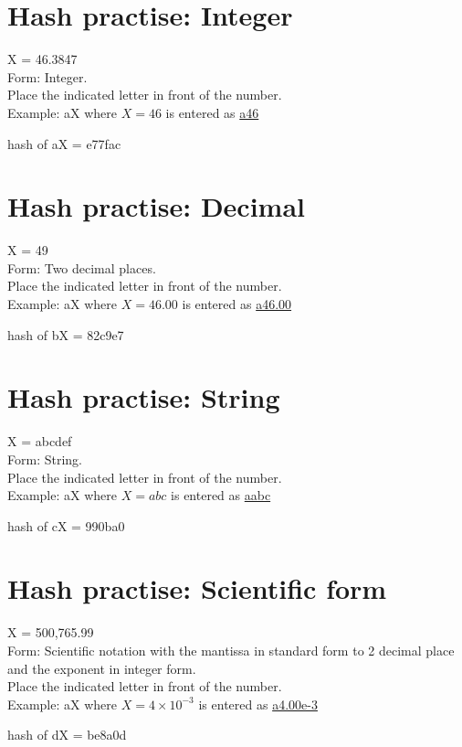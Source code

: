 \section{Hash practise: Integer}

X = 46.3847\\
Form: Integer.\\
Place the indicated letter in front of the number.\\
Example: aX where $X=46$ is entered as \href{http://www.wolframalpha.com/input/?i=md5+hash+of+\%22a46\%22}{a46}

hash of aX = e77fac

\section{Hash practise: Decimal}

X = 49\\
Form: Two decimal places.\\
Place the indicated letter in front of the number.\\
Example: aX where $X=46.00$ is entered as \href{http://www.wolframalpha.com/input/?i=md5+hash+of+\%22a46.00\%22}{a46.00}

hash of bX = 82c9e7

\section{Hash practise: String}

X = abcdef\\
Form: String.\\
Place the indicated letter in front of the number.\\
Example: aX where $X=abc$ is entered as \href{http://www.wolframalpha.com/input/?i=md5+hash+of+\%22aabc\%22}{aabc}

hash of cX = 990ba0

\section{Hash practise: Scientific form}

X = 500,765.99\\
Form: Scientific notation with the mantissa in standard form to 2 decimal place and the exponent in integer form.\\
Place the indicated letter in front of the number.\\
Example: aX where $X=4 \times 10^{-3}$ is entered as \href{http://www.wolframalpha.com/input/?i=md5+hash+of+\%22a4.00e-3\%22}{a4.00e-3}

hash of dX = be8a0d


